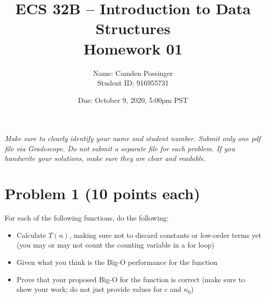 \documentclass[11pt]{article}
\title{ECS 32B -- Introduction to Data Structures \\ Homework 01}
\author{Name:  Camden Possinger\\
Student ID: 916955731 }
\date{Due: October 9, 2020, 5:00pm PST}
\begin{document}
\maketitle

\textit{Make sure to clearly identify your name and student number. Submit only one
pdf file via Gradescope. Do not submit a separate file for each problem. If you
handwrite your solutions, make sure they are clear and readable.}

\section*{Problem 1 (10 points each)}
For each of the following functions, do the following:
      \begin{itemize}
      \item Calculate $T(n)$, making sure not to discard constants or low-order terms
            yet (you may or may not count the counting variable in a for loop)
      \item Given what you think is the Big-O performance for the function
      \item Prove that your proposed Big-O for the function is correct (make sure to
            show your work; do not just provide values for $c$ and $n_0$)
      \end{itemize}
      \vspace{20pt}
      
\end{document}
